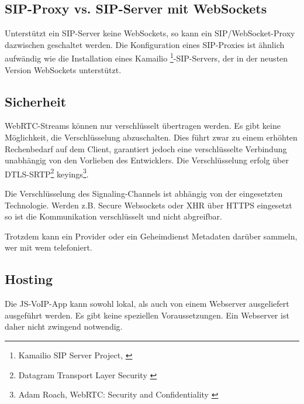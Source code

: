 	\subsection{SIP-Proxy vs. SIP-Server mit WebSockets}
		Unterstützt ein SIP-Server keine WebSockets, so kann ein SIP/WebSocket-Proxy
		dazwischen geschaltet werden. Die Konfiguration eines SIP-Proxies ist ähnlich
		aufwändig wie die Installation eines Kamailio
		\footnote{Kamailio SIP Server Project, \cite{Kamailio-Project}}-SIP-Servers, der in der neusten Version WebSockets unterstützt.

	\subsection{Sicherheit}
		WebRTC-Streams können nur verschlüsselt übertragen werden. Es gibt keine
		Möglichkeit, die Verschlüsselung abzuschalten. Dies führt zwar zu einem
		erhöhten Rechenbedarf auf dem Client, garantiert jedoch eine verschlüsselte
		Verbindung unabhängig von den Vorlieben des Entwicklers.
		Die Verschlüsselung erfolg über DTLS-SRTP\footnote{Datagram Transport Layer Security \cite{IETF-DTLS-RFC}} 
		keyings\footnote{Adam Roach, WebRTC: Security and Confidentiality \cite{AdamRoach-WebRTC-Security}}. 
		
		Die Verschlüsselung des Signaling-Channels ist abhängig von der eingesetzten
		Technologie. Werden z.B. Secure Websockets oder XHR über HTTPS eingesetzt so ist die Kommunikation verschlüsselt und nicht abgreifbar.
		
		Trotzdem kann ein Provider oder ein Geheimdienst Metadaten darüber sammeln, wer mit wem telefoniert.
		  
	\subsection{Hosting}
		Die JS-VoIP-App kann sowohl lokal, als auch von einem
		Webserver ausgeliefert ausgeführt werden. Es gibt keine speziellen Voraussetzungen. Ein Webserver ist daher nicht zwingend notwendig.
		

\clearpage
